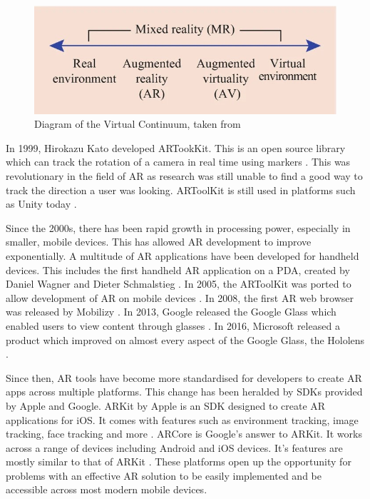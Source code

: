 \documentclass{l4proj}
\begin{document}
\begin{figure}[hbt!]
    \centering
    \includegraphics[width=0.5\linewidth]{dissertation//images/rvContinuum.jpg}
    \caption{Diagram of the Virtual Continuum, taken from \citep{vertucci_history_2023}}
    \label{fig:rvContinuum}
\end{figure}

In 1999, Hirokazu Kato developed ARTookKit. This is an open source library which can track the rotation of a camera in real time using markers \citep{kato1999marker}. This was revolutionary in the field of AR as research was still unable to find a good way to track the direction a user was looking. ARToolKit is still used in platforms such as Unity today \citep{vertucci_history_2023}.

Since the 2000s, there has been rapid growth in processing power, especially in smaller, mobile devices. This has allowed AR development to improve exponentially. A multitude of AR applications have been developed for handheld devices. This includes the first handheld AR application on a PDA, created by Daniel Wagner and Dieter Schmalstieg \citep{1241402}. In 2005, the ARToolKit was ported to allow development of AR on mobile devices \citep{10.1145/1179849.1179865}. In 2008, the first AR web browser was released by Mobilizy \citep{vertucci_history_2023}. In 2013, Google released the Google Glass which enabled users to view content through glasses \citep{vertucci_history_2023}. In 2016, Microsoft released a product which improved on almost every aspect of the Google Glass, the Hololens \citep{vertucci_history_2023}.

Since then, AR tools have become more standardised for developers to create AR apps across multiple platforms. This change has been heralded by SDKs provided by Apple and Google. ARKit by Apple is an SDK designed to create AR applications for iOS. 
It comes with features such as environment tracking, image tracking, face tracking and more \citep{9204243}. ARCore is Google's answer to ARKit. It works across a range of devices including Android and iOS devices. It's features are mostly similar to that of ARKit \citep{9204243}. These platforms open up the opportunity for problems with an effective AR solution to be easily implemented and be accessible across most modern mobile devices.
\end{document}
